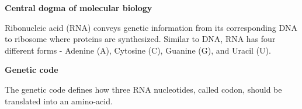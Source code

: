 \documentclass[12pt, answers]{exam}
\begin{document}
\begin{questions}

\question \textbf{Central dogma of molecular biology}
  
Ribonucleic acid (RNA) conveys genetic information from its corresponding DNA to ribosome where proteins are synthesized. Similar to DNA, RNA has four different forms - Adenine (A), Cytosine (C), Guanine (G), and Uracil (U).

\vspace{0.1 in}


\question \textbf{Genetic code}
  
The genetic code defines how three RNA nucleotides, called codon, should be translated into an amino-acid. 


\end{questions}
\end{document}
